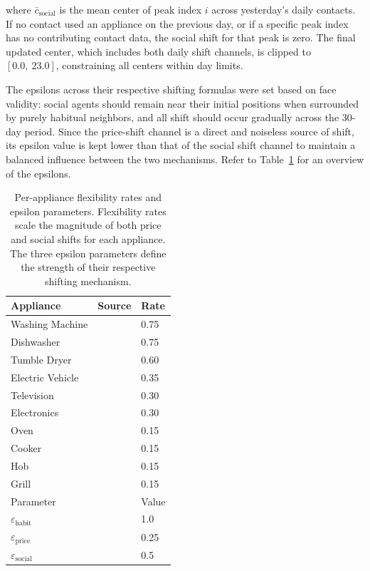 \documentclass[11pt, a4paper]{article}
\begin{document}
\noindent where $\bar{c}_{\text{social}}$ is the mean center of peak index $i$ across yesterday's daily contacts. If no contact used an appliance on the previous day, or if a specific peak index has no contributing contact data, the social shift for that peak is zero. The final updated center, which includes both daily shift channels, is clipped to $[0.0,\ 23.0]$, constraining all centers within day limits. 

The epsilons across their respective shifting formulas were set based on face validity: social agents should remain near their initial positions when surrounded by purely habitual neighbors, and all shift should occur gradually across the 30-day period. Since the price-shift channel is a direct and noiseless source of shift, its epsilon value is kept lower than that of the social shift channel to maintain a balanced influence between the two mechanisms. Refer to Table~\ref{tab:shift_params} for an overview of the epsilons.

\begin{table}
    \caption{Per-appliance flexibility rates and epsilon parameters. Flexibility rates scale the magnitude of both price and social shifts for each appliance. The three epsilon parameters define the strength of their respective shifting mechanism.}
    \label{tab:shift_params}
    \centering
    \small
    \begin{tabular}{lll}
        \toprule
        Appliance         & Source                        & Rate \\
        \midrule
        Washing Machine   & \textcite{berg_occupant-driven_2024}  & 0.75 \\
        Dishwasher        & \textcite{berg_occupant-driven_2024}  & 0.75 \\
        Tumble Dryer      & \textcite{berg_occupant-driven_2024}  & 0.60 \\
        Electric Vehicle  & \textcite{sorensen_analysis_2021}     & 0.35 \\
        Television        &                                       & 0.30 \\
        Electronics       &                                       & 0.30 \\
        Oven              & \textcite{berg_occupant-driven_2024}  & 0.15 \\
        Cooker            & \textcite{berg_occupant-driven_2024}  & 0.15 \\
        Hob               & \textcite{berg_occupant-driven_2024}  & 0.15 \\
        Grill             & \textcite{berg_occupant-driven_2024}  & 0.15 \\
        \midrule
        Parameter                         &                & Value \\
        \midrule
        $\varepsilon_{\text{habit}}$      &                & 1.0  \\
        $\varepsilon_{\text{price}}$      &                & 0.25 \\
        $\varepsilon_{\text{social}}$     &                & 0.5  \\
        \bottomrule
    \end{tabular}
\end{table}
\end{document}
